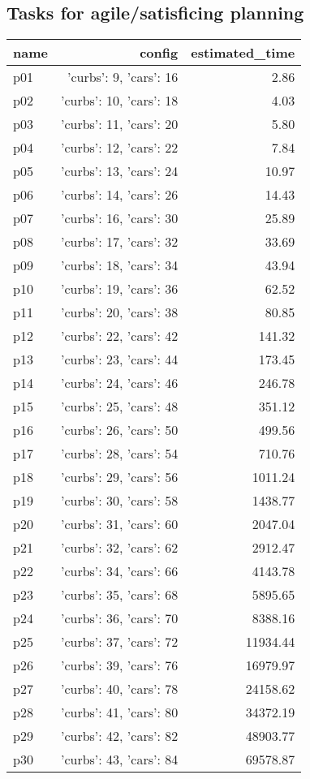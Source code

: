 \documentclass{article}
\begin{document}
                                \subsection*{Tasks for agile/satisficing planning}
                                
                            \begin{center}
                            \scriptsize
                            \begin{tabular}{@{}l|r|r@{}}
                            name & config & estimated\_time\\\midrule
                              p01&{'curbs': 9, 'cars': 16}&2.86\\
  p02&{'curbs': 10, 'cars': 18}&4.03\\
  p03&{'curbs': 11, 'cars': 20}&5.80\\
  p04&{'curbs': 12, 'cars': 22}&7.84\\
  p05&{'curbs': 13, 'cars': 24}&10.97\\
  p06&{'curbs': 14, 'cars': 26}&14.43\\
  p07&{'curbs': 16, 'cars': 30}&25.89\\
  p08&{'curbs': 17, 'cars': 32}&33.69\\
  p09&{'curbs': 18, 'cars': 34}&43.94\\
  p10&{'curbs': 19, 'cars': 36}&62.52\\
  p11&{'curbs': 20, 'cars': 38}&80.85\\
  p12&{'curbs': 22, 'cars': 42}&141.32\\
  p13&{'curbs': 23, 'cars': 44}&173.45\\
  p14&{'curbs': 24, 'cars': 46}&246.78\\
  p15&{'curbs': 25, 'cars': 48}&351.12\\
  p16&{'curbs': 26, 'cars': 50}&499.56\\
  p17&{'curbs': 28, 'cars': 54}&710.76\\
  p18&{'curbs': 29, 'cars': 56}&1011.24\\
  p19&{'curbs': 30, 'cars': 58}&1438.77\\
  p20&{'curbs': 31, 'cars': 60}&2047.04\\
  p21&{'curbs': 32, 'cars': 62}&2912.47\\
  p22&{'curbs': 34, 'cars': 66}&4143.78\\
  p23&{'curbs': 35, 'cars': 68}&5895.65\\
  p24&{'curbs': 36, 'cars': 70}&8388.16\\
  p25&{'curbs': 37, 'cars': 72}&11934.44\\
  p26&{'curbs': 39, 'cars': 76}&16979.97\\
  p27&{'curbs': 40, 'cars': 78}&24158.62\\
  p28&{'curbs': 41, 'cars': 80}&34372.19\\
  p29&{'curbs': 42, 'cars': 82}&48903.77\\
  p30&{'curbs': 43, 'cars': 84}&69578.87
                            \end{tabular}
                            \end{center}
                    
\end{document}
